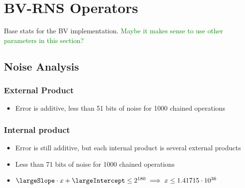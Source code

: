 \section{BV-RNS Operators}
Base stats for the BV implementation. \textcolor{green}{Maybe it makes sense to use other parameters in this section?}

\subsection{Noise Analysis}
\subsubsection{External Product}
\begin{itemize}
    \item Error is additive, less than 51 bits of noise for 1000 chained operations 
\end{itemize}


\subsubsection{Internal product}
\begin{itemize}
    \item Error is still additive, but each internal product is several external products
    \item Less than 71 bits of noise for 1000 chained operations
\end{itemize}

\begin{itemize}
    \item $\largeSlope\cdot x + \largeIntercept \leq 2^{180} \implies x \leq 1.41715\cdot 10^{36}$
\end{itemize}

